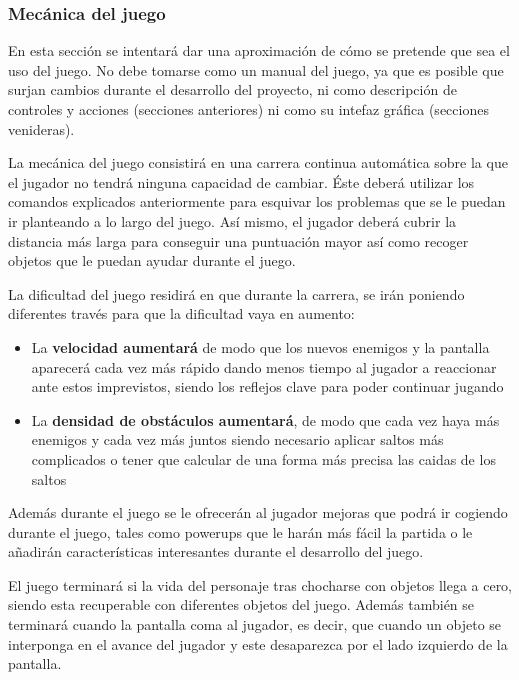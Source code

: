 \documentclass[a4paper]{article}
\begin{document}
\subsubsection{Mecánica del juego}

En esta sección se intentará dar una aproximación de cómo se pretende que sea el uso del juego. No debe tomarse como un manual del juego, ya que es posible que surjan cambios durante el desarrollo del proyecto, ni como descripción de controles y acciones (secciones anteriores) ni como su intefaz gráfica (secciones venideras).

La mecánica del juego consistirá en una carrera continua automática sobre la que el jugador no tendrá ninguna capacidad de cambiar. Éste deberá utilizar los comandos explicados anteriormente para esquivar los problemas que se le puedan ir planteando a lo largo del juego. Así mismo, el jugador deberá cubrir la distancia más larga para conseguir una puntuación mayor así como recoger objetos que le puedan ayudar durante el juego.

La dificultad del juego residirá en que durante la carrera, se irán poniendo diferentes través para que la dificultad vaya en aumento:

\begin{itemize}
    \item La \textbf{velocidad aumentará} de modo que los nuevos enemigos y la pantalla aparecerá cada vez más rápido dando menos tiempo al jugador a reaccionar ante estos imprevistos, siendo los reflejos clave para poder continuar jugando
    \item La \textbf{densidad de obstáculos aumentará}, de modo que cada vez haya más enemigos y cada vez más juntos siendo necesario aplicar saltos más complicados o tener que calcular de una forma más precisa las caidas de los saltos
\end{itemize}

Además durante el juego se le ofrecerán al jugador mejoras que podrá ir cogiendo durante el juego, tales como powerups que le harán más fácil la partida o le añadirán características interesantes durante el desarrollo del juego.

El juego terminará si la vida del personaje tras chocharse con objetos llega a cero, siendo esta recuperable con diferentes objetos del juego. Además también se terminará cuando la pantalla coma al jugador, es decir, que cuando un objeto se interponga en el avance del jugador y este desaparezca por el lado izquierdo de la pantalla.
\end{document}
